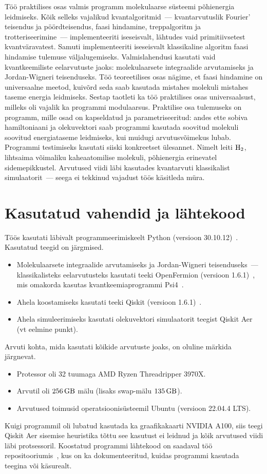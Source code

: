 \documentclass[12pt]{report}
\begin{document}
Töö praktilises osas valmis programm molekulaarse süsteemi põhienergia leidmiseks.
Kõik selleks vajalikud kvantalgoritmid~--- kvantarvutuslik Fourier' teisendus ja pöördteisendus, faasi hindamine, treppalgoritm ja trotteriseerimine~--- implementeeriti iseseisvalt, lähtudes vaid primitiivsetest kvantväravatest.
Samuti implementeeriti iseseisvalt klassikaline algoritm faasi hindamise tulemuse väljalugemiseks.
Valmislahendusi kasutati vaid kvantkeemiliste eelarvutuste jaoks: molekulaarsete integraalide arvutamiseks ja Jordan-Wigneri teisenduseks.
Töö teoreetilises osas nägime, et faasi hindamine on universaalne meetod, kuivõrd seda saab kasutada mistahes molekuli mistahes taseme energia leidmiseks.
Sestap taotleti ka töö praktilises osas universaalsust, milleks oli vajalik ka programmi modulaarsus.
Praktilise osa tulemuseks on programm, mille osad on kapseldatud ja parametriseeritud: andes ette sobiva hamiltoniaani ja olekuvektori saab programmi kasutada soovitud molekuli soovitud energiataseme leidmiseks, kui muidugi arvutusvõimekus lubab.
Programmi testimiseks kasutati siiski konkreetset ülesannet.
Nimelt leiti \(\rm H_2\), lihtsaima võimaliku kaheaatomilise molekuli, põhienergia erinevatel sidemepikkustel.
Arvutused viidi läbi kasutades kvantarvuti klassikalist simulaatorit~--- seega  ei tekkinud vajadust töös käsitleda müra.

\section{Kasutatud vahendid ja lähtekood}

Töös kasutati läbivalt programmeerimiskeelt Python (versioon 30.10.12)~\cite{python}.
Kasutatud teegid on järgmised.
\begin{itemize}
  \item Molekulaarsete integraalide arvutamiseks ja Jordan-Wigneri teisenduseks~--- klassikalisteks eelarvutusteks kasutati teeki OpenFermion (versioon 1.6.1)~\cite{openfermion}, mis omakorda kasutas kvantkeemiaprogrammi Psi4~\cite{psi4}.
  \item Ahela koostamiseks kasutati teeki Qiskit (versioon 1.6.1)~\cite{qiskit}.
  \item Ahela simuleerimiseks kasutati olekuvektori simulaatorit teegist Qiskit Aer (vt eelmine punkt).
\end{itemize}
Arvuti kohta, mida kasutati kõikide arvutuste joaks, on oluline märkida järgnevat.
\begin{itemize}
  \item Protessor oli 32 tuumaga AMD Ryzen Threadripper 3970X.
  \item Arvutil oli \(256\,{\rm GB}\) mälu (lisaks swap-mälu \(135\,{\rm GB}\)).
  \item Arvutused toimusid operatsioonisüsteemil Ubuntu (versioon 22.04.4 LTS).
\end{itemize}
Kuigi programmil oli lubatud kasutada ka graafikakaarti NVIDIA A100, siis teegi Qiskit Aer sisemise heuristika tõttu see kasutust ei leidnud ja kõik arvutused viidi läbi protsessoril.
Koostatud programmi lähtekood on saadaval töö repositooriumis~\cite{repo}, kus on ka dokumenteeritud, kuidas programmi kasutada teegina või käsurealt.
\end{document}
